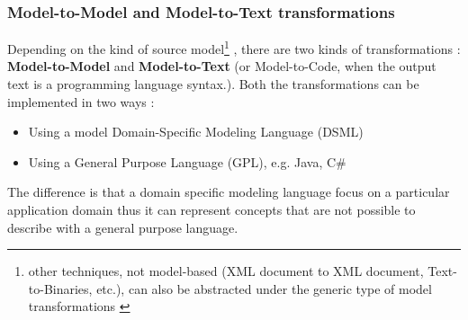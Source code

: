 \subsubsection{Model-to-Model and Model-to-Text transformations}
\label{m2m&m2t}
Depending on the kind of source model\footnote{other techniques, not model-based (XML document to XML document, Text-to-Binaries, etc.), can also be abstracted under the generic type of model transformations \cite{M2TandM2M}} , there are two kinds of transformations \cite{Papa11}: \textbf{Model-to-Model} and \textbf{Model-to-Text} (or Model-to-Code, when the output text is a programming language syntax.). Both the transformations can be implemented in two ways \cite{M2TandM2M}:
\begin{itemize}
 \item Using a model Domain-Specific Modeling Language (DSML)
 \item Using a General Purpose Language (GPL), e.g. Java, C\#
\end{itemize}
The difference is that a domain specific modeling language focus on a particular application domain thus it can represent concepts that are not possible to describe with a general purpose language.

